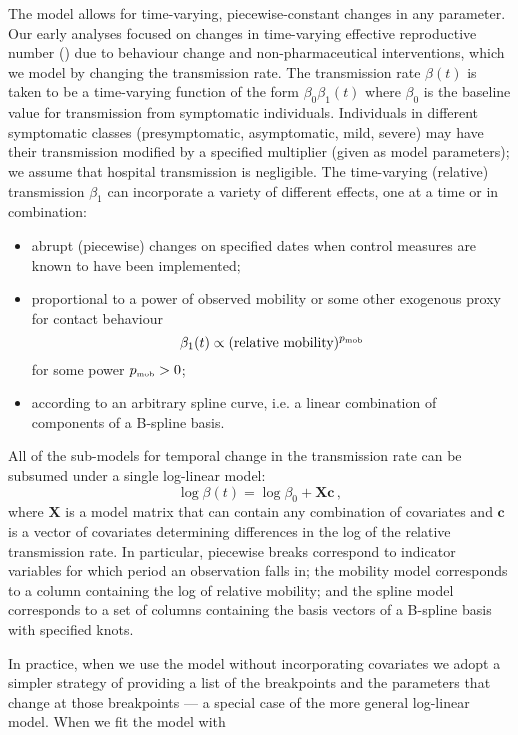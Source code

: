 \documentclass[12pt]{article}\usepackage[]{graphicx}\usepackage[]{color}
\begin{document}
The model allows for time-varying, piecewise-constant changes in any parameter. 
Our early analyses focused on changes in time-varying effective reproductive number (\Rt) due to behaviour change and non-pharmaceutical interventions, which we model by changing the transmission rate.
The transmission rate $\beta(t)$ is taken to be a time-varying function of the form $\beta_0 \beta_1(t)$ where $\beta_0$ is the baseline value for transmission from symptomatic individuals.
Individuals in different symptomatic classes (presymptomatic, asymptomatic, mild, severe) may have their transmission modified by a specified multiplier (given as model parameters); we assume that hospital transmission is negligible.
The time-varying (relative) transmission $\beta_1$ can incorporate a variety of different effects, one at a time or in combination:
\begin{itemize}
\item abrupt (piecewise) changes on specified dates when control measures are known to have been implemented;
\item proportional to a power of observed mobility or some other exogenous proxy for contact behaviour
\[
  \beta_1(t) \propto (\textrm{relative mobility})^{{{p}_{\textrm{\tiny mob}}}}
\]
for some power ${{p}_{\textrm{\tiny mob}}}>0$;
\item according to an arbitrary spline curve, i.e. a linear combination of components of a B-spline basis.
\end{itemize}

All of the sub-models for temporal change in the transmission rate can be subsumed under a single log-linear model:
\begin{equation}\label{eq:betamodel}
\log \beta(t) = \log \beta_0 + \boldsymbol{X}\boldsymbol{c}
\,,
\end{equation}
where $\boldsymbol{X}$ is a model matrix that can contain any combination of covariates and $\boldsymbol{c}$ is a vector of covariates determining differences in the log of the relative transmission rate.
In particular, piecewise breaks correspond to indicator variables for which period an observation falls in; the mobility model corresponds to a column containing the log of relative mobility; and the spline model corresponds to a set of columns containing the basis vectors of a B-spline basis with specified knots.

In practice, when we use the model without incorporating covariates we adopt a simpler strategy of providing a list of the breakpoints and the parameters that change at those breakpoints --- a special case of the more general log-linear model. When we fit the model with 
\end{document}
